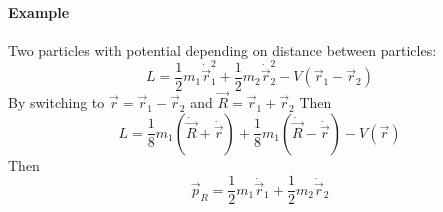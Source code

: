 \paragraph{Example}
Two particles with potential depending on distance between particles:
$$L = \frac{1}{2}m_1 \dot{\vec{r}}_1^2+\frac{1}{2}m_2 \dot{\vec{r}}_2^2 - V(\vec{r}_1 -\vec{r}_2)$$
By switching to $\vec{r} = \vec{r}_1 - \vec{r}_2$ and $\vec{R} = \vec{r}_1 + \vec{r}_2$ 
Then
$$L = \frac{1}{8}m_1 \left(\dot{\vec{R}} + \dot{\vec{r}}\right) +\frac{1}{8}m_1 \left(\dot{\vec{R}} - \dot{\vec{r}}\right)  - V(\vec{r})$$
Then
$$\vec{p}_R =\frac{1}{2}m_1\dot{\vec{r}}_1+\frac{1}{2}m_2\dot{\vec{r}}_2$$